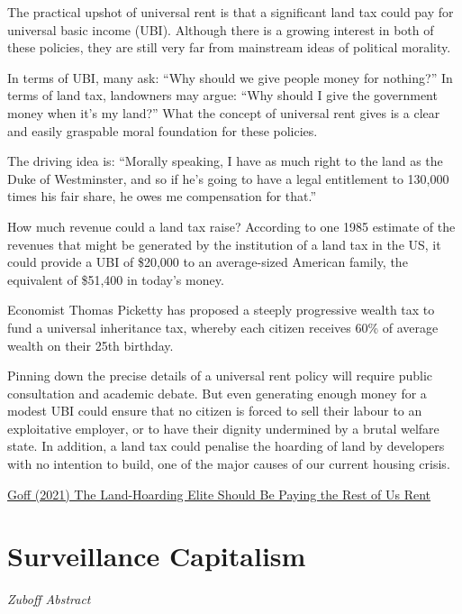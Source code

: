 \documentclass[
]{book}
\begin{document}
The practical upshot of universal rent is that a significant land tax could pay for universal basic income (UBI). Although there is a growing interest in both of these policies, they are still very far from mainstream ideas of political morality.

In terms of UBI, many ask: ``Why should we give people money for nothing?'' In terms of land tax, landowners may argue: ``Why should I give the government money when it's my land?'' What the concept of universal rent gives is a clear and easily graspable moral foundation for these policies.

The driving idea is: ``Morally speaking, I have as much right to the land as the Duke of Westminster, and so if he's going to have a legal entitlement to 130,000 times his fair share, he owes me compensation for that.''

How much revenue could a land tax raise? According to one 1985 estimate of the revenues that might be generated by the institution of a land tax in the US, it could provide a UBI of \$20,000 to an average-sized American family, the equivalent of \$51,400 in today's money.

Economist Thomas Picketty has proposed a steeply progressive wealth tax to fund a universal inheritance tax, whereby each citizen receives 60\% of average wealth on their 25th birthday.

Pinning down the precise details of a universal rent policy will require public consultation and academic debate. But even generating enough money for a modest UBI could ensure that no citizen is forced to sell their labour to an exploitative employer, or to have their dignity undermined by a brutal welfare state. In addition, a land tax could penalise the hoarding of land by developers with no intention to build, one of the major causes of our current housing crisis.

\href{https://novaramedia.com/2021/12/29/the-land-hoarding-elite-should-be-paying-the-rest-of-us-rent/}{Goff (2021) The Land-Hoarding Elite Should Be Paying the Rest of Us Rent}

\hypertarget{surveillance-capitalism}{%
\chapter{Surveillance Capitalism}\label{surveillance-capitalism}}

\emph{Zuboff Abstract}
\end{document}
